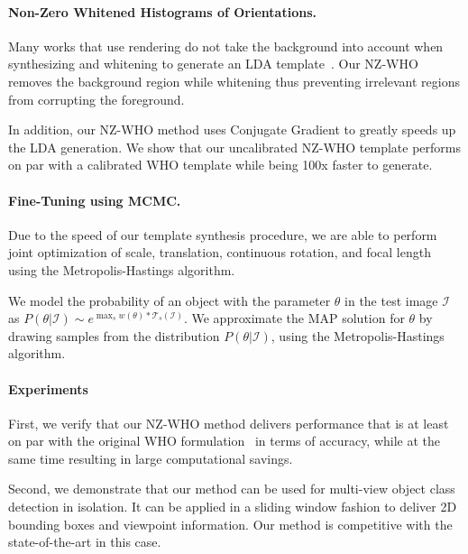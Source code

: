 \documentclass[extendedabs]{bmvc2k}
\begin{document}
\vspace{-0.1in}
\paragraph{Non-Zero Whitened Histograms of Orientations.} Many works that use
rendering do not take the background into account
when synthesizing and whitening to generate an LDA template~\cite{Aubry14}. Our NZ-WHO removes the
background region while whitening thus preventing irrelevant regions from
corrupting the foreground.

In addition, our NZ-WHO method uses Conjugate Gradient to greatly speeds up the LDA generation. We show that our uncalibrated NZ-WHO template performs on par
with a calibrated WHO template while being 100x faster to generate.


\vspace{-0.1in}
\paragraph{Fine-Tuning using MCMC.} Due to the speed of our template synthesis
procedure, we are able to perform joint optimization of scale, translation,
continuous rotation, and focal length using the Metropolis-Hastings algorithm.

We model the probability of an object with the parameter $\theta$ in the test
image $\mathcal{I}$ as $P(\theta| \mathcal{I}) \sim e^{ \max_{s} w(\theta)
	\ast \mathcal{T}_s(\mathcal{I})}$. We approximate the MAP solution for $\theta$ by
drawing samples from the distribution $P(\theta | \mathcal{I})$, using the
Metropolis-Hastings algorithm.

\vspace{-0.1in}
\paragraph{Experiments} First, we verify that our NZ-WHO method delivers
performance that is at least on par with the original WHO
formulation~\cite{Hariharan12} in terms of accuracy, while at the same time
resulting in large computational savings.

Second, we demonstrate that our method can be used for multi-view
object class detection in isolation. It can be applied in a sliding
window fashion to deliver 2D bounding boxes and viewpoint
information. Our method is competitive with the state-of-the-art in this
case.
\end{document}
